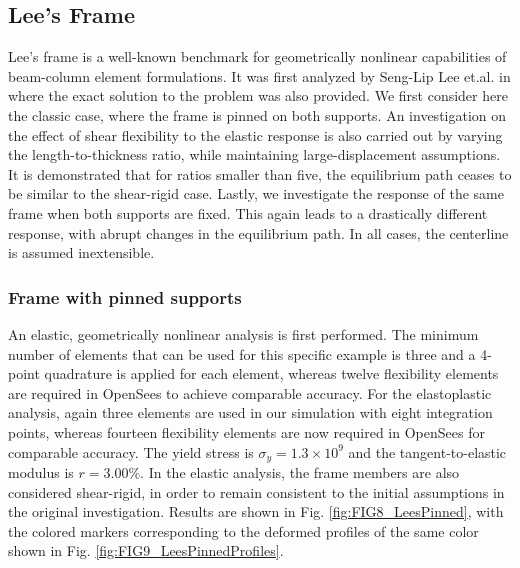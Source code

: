 \subsection{Lee's Frame}
Lee's frame is a well-known benchmark for geometrically nonlinear capabilities
of beam-column element formulations.  It was first analyzed by Seng-Lip Lee
et.al. in
\cite{Lee} where the exact solution to the problem was also provided. We
first consider here the classic case, where the frame is pinned on both 
supports.
An investigation on the effect of shear flexibility to the elastic response
is also carried out by varying the length-to-thickness ratio, while maintaining
large-displacement assumptions. It is demonstrated that for ratios smaller than
five, the equilibrium path ceases to be similar to the shear-rigid case. Lastly,
we investigate the response of the same frame when both supports are fixed. This
again leads to a drastically different response, with abrupt changes in the
equilibrium path.  In all cases, the centerline is assumed inextensible.

\subsubsection{Frame with pinned supports}\label{leespinned}

An elastic, geometrically nonlinear analysis is first performed.
The minimum number of elements that can be used for this specific example is 
three
and a 4-point quadrature is applied for each element, whereas twelve flexibility
elements are required in OpenSees to achieve comparable accuracy.
For the elastoplastic analysis, again three elements are used in our
simulation with eight integration points,
whereas fourteen flexibility elements are now required in OpenSees for 
comparable
accuracy. The yield stress is $\sigma_y=1.3\times 10^{9}$ and the
tangent-to-elastic modulus \ratio is $r=3.00\%$. In the elastic
analysis, the
frame members are also considered shear-rigid, in order to remain consistent
to the initial assumptions in the original investigation\cite{Lee}.
Results are shown in Fig. \ref{fig:FIG8_LeesPinned}, with the colored
markers corresponding to the deformed profiles of the same color shown in
Fig. \ref{fig:FIG9_LeesPinnedProfiles}.

\begin{figure*}[t]
	\centering
	\qquad
	\caption{Geometrically nonlinear analyses of Lee's frame with pinned
		supports.}%
	\label{fig:FIG8_LeesPinned}%
\end{figure*}

